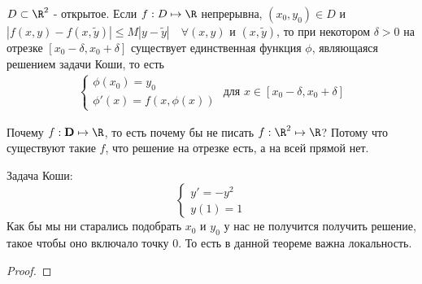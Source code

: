 \begin{theorem}[Пикара] \thmslashn

  $D \subset \R^2$ - открытое. Если $f : D \mapsto \R$ непрерывна, $(x_0, y_0) \in D$ и $|f(x, y) - f(x, \tilde y)| \le M|y - \tilde y| \quad \forall (x, y)$ и $(x, \tilde y)$,
  то при некотором $\delta > 0$ на отрезке $[x_0 - \delta, x_0 + \delta]$ существует единственная функция $\phi$, являющаяся решением задачи Коши, то есть
  \[\begin{aligned}
    \begin{cases}
      \phi(x_0) = y_0\\
      \phi'(x) = f(x, \phi(x))
    \end{cases}\text{ для } x \in [x_0 - \delta, x_0 + \delta]
  \end{aligned}\]
  
  \begin{remark} \thmslashn

    Почему $f : \textbf{D} \mapsto \R$, то есть почему бы не писать $f : \R^2 \mapsto \R$? Потому что существуют такие $f$, что решение на отрезке есть, а на всей прямой нет.
    \begin{example} \thmslashn

      Задача Коши:
      \[\begin{cases}
        y' = -y^2 \\
        y(1) = 1
      \end{cases}\]
      Как бы мы ни старались подобрать $x_0$ и $y_0$ у нас не получится получить решение, такое чтобы оно включало точку 0. То есть в данной теореме важна локальность.
    \end{example}
  \end{remark}

  \begin{proof} \thmslashn


\end{proof}
\end{theorem}
